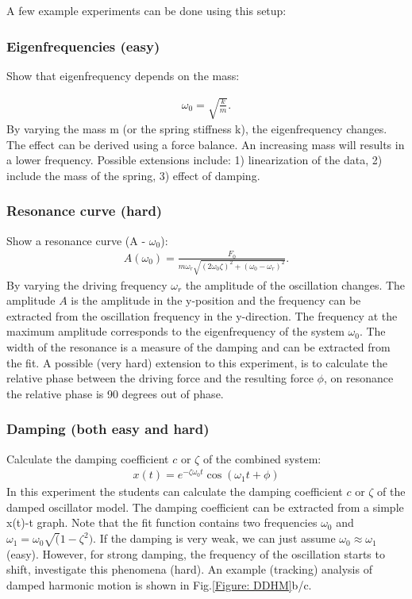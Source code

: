 \documentclass{article}
\begin{document}
A few example experiments can be done using this setup:

\subsubsection{Eigenfrequencies (easy)}    
Show that eigenfrequency depends on the mass:

\begin{align}
    \omega_0 = \sqrt{\frac{k}{m}}.
\end{align}
By varying the mass m (or the spring stiffness k), the eigenfrequency changes. The effect can be derived using a force balance. An increasing mass will results in a lower frequency. Possible extensions include: 1) linearization of the data, 2) include the mass of the spring, 3) effect of damping.

\subsubsection{Resonance curve (hard)}    
Show a resonance curve (A - $\omega_0$):
\begin{align}
    A(\omega_0) = \frac{F_0}{m\omega_r \sqrt{(2\omega_0\zeta)^2+(\omega_0-\omega_r)^2}}.
\end{align}
By varying the driving frequency $\omega_r$ the amplitude of the oscillation changes. The amplitude $A$ is the amplitude in the y-position and the frequency can be extracted from the oscillation frequency in the y-direction. The frequency at the maximum amplitude corresponds to the eigenfrequency of the system $\omega_0$. The width of the resonance is a measure of the damping and can be extracted from the fit. A possible (very hard) extension to this experiment, is to calculate the relative phase between the driving force and the resulting force $\phi$, on resonance the relative phase is 90 degrees out of phase. 

\subsubsection{Damping (both easy and hard)}    
Calculate the damping coefficient $c$ or $\zeta$ of the combined system:
\begin{align}
    x(t) = e^{-\zeta\omega_0 t}\cos(\omega_1t + \phi)
\end{align}
In this experiment the students can calculate the damping coefficient $c$ or $\zeta$ of the damped oscillator model. The damping coefficient can be extracted from a simple x(t)-t graph. Note that the fit function contains two frequencies $\omega_0$ and $\omega_1 = \omega_0\sqrt(1-\zeta^2)$. If the damping is very weak, we can just assume $\omega_0\approx\omega_1$ (easy). However, for strong damping, the frequency of the oscillation starts to shift, investigate this phenomena (hard). An example (tracking) analysis of damped harmonic motion is shown in Fig.\ref{Figure: DDHM}b/c. 
\end{document}
